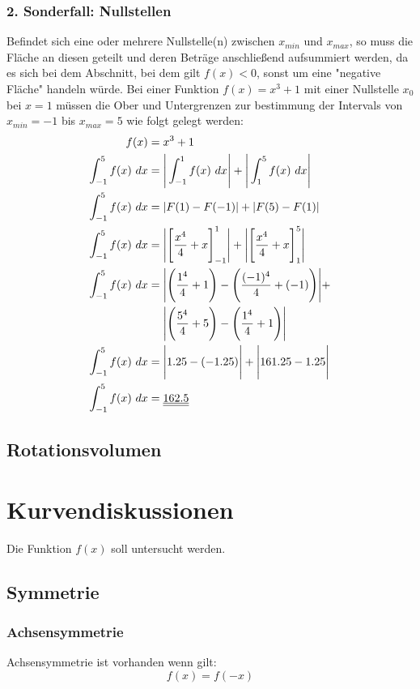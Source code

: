 \documentclass[a4paper,12pt]{article}
\begin{document}
\subsubsection{2. Sonderfall: Nullstellen}
Befindet sich eine oder mehrere Nullstelle(n) zwischen $x_{min}$ und $x_{max}$, so muss die Fläche an diesen geteilt und deren Beträge anschließend aufsummiert werden, 
da es sich bei dem Abschnitt, bei dem gilt $f(x) < 0$, sonst um eine "negative Fläche" handeln würde. Bei einer Funktion $f(x) = x^3 + 1$ mit einer Nullstelle 
$x_0$ bei $x = 1$ müssen die Ober und Untergrenzen zur bestimmung der Intervals von $x_{min} = -1$ bis $x_{max} = 5$ wie folgt gelegt werden:
\begin{equation}
\begin{split}
f(x) & = x^3 + 1\\
\int_{-1}^5 f(x)\ dx & = \Bigg{|} \int_{-1}^1 f(x)\ dx \Bigg{|} + \Bigg{|} \int_1^5 f(x)\ dx\Bigg{|}\\
\int_{-1}^5 f(x)\ dx & = | F(1) - F(-1) | + | F(5) - F(1) |\\
\int_{-1}^5 f(x)\ dx & = \Bigg{|}\Bigg{[}\frac{x^4}{4} + x\Bigg{]}_{-1}^1\Bigg{|} + \Bigg{|}\Bigg{[}\frac{x^4}{4} + x\Bigg{]}_1^5\Bigg{|}\\
\int_{-1}^5 f(x)\ dx & = \Bigg{|}\Bigg{(}\frac{1^4}{4} + 1\Bigg{)} - \Bigg{(}\frac{(-1)^4}{4} + (-1)\Bigg{)}\Bigg{|} + \\
&\ \ \ \ \Bigg{|}\Bigg{(}\frac{5^4}{4} + 5 \Bigg{)} - \Bigg{(}\frac{1^4}{4} + 1\Bigg{)}\Bigg{|}\\
\int_{-1}^5 f(x)\ dx & = \Bigg{|} 1.25 - (-1.25)\Bigg{|} + \Bigg{|} 161.25 - 1.25\Bigg{|}\\
\int_{-1}^5 f(x)\ dx & = \underline{\underline{162.5}}
\end{split}
\end{equation}
\pagebreak
\subsection{Rotationsvolumen}
\pagebreak
\section{Kurvendiskussionen}
Die Funktion $f(x)$ soll untersucht werden.
\subsection{Symmetrie}
\subsubsection{Achsensymmetrie}
Achsensymmetrie ist vorhanden wenn gilt:
$$f(x) = f(-x)$$
\end{document}

